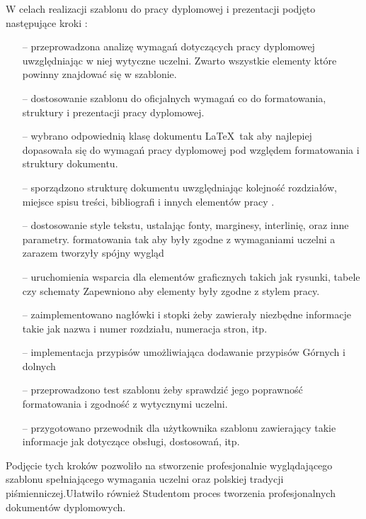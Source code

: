 

W celach realizacji szablonu do pracy dyplomowej i prezentacji podjęto następujące kroki :
\begin{itemize}

\item[--] przeprowadzona analizę wymagań dotyczących pracy dyplomowej uwzględniając w niej wytyczne uczelni. Zwarto wszystkie elementy które powinny znajdować się w szablonie.
\item[--] dostosowanie szablonu do oficjalnych wymagań co do  formatowania, struktury i prezentacji pracy dyplomowej.
\item[--] wybrano odpowiednią klasę dokumentu \LaTeX\ tak aby najlepiej dopasowała się do wymagań pracy dyplomowej pod względem formatowania i struktury dokumentu.
\item[--] sporządzono strukturę dokumentu uwzględniając kolejność rozdziałów, miejsce spisu treści, bibliografi i innych elementów pracy .
\item[--] dostosowanie style tekstu, ustalając fonty, marginesy, interlinię, oraz inne parametry. formatowania tak aby były zgodne z wymaganiami uczelni a zarazem tworzyły spójny wygląd 
\item[--] uruchomienia wsparcia dla elementów graficznych takich  jak rysunki, tabele czy schematy Zapewniono aby elementy były zgodne z stylem pracy.
\item[--] zaimplementowano nagłówki i stopki żeby zawierały niezbędne informacje takie jak nazwa i numer rozdziału, numeracja stron, itp.
\item[--] implementacja przypisów umożliwiająca dodawanie przypisów Górnych i dolnych 
\item[--] przeprowadzono test szablonu żeby sprawdzić jego poprawność formatowania i zgodność z wytycznymi uczelni.
\item[--] przygotowano przewodnik dla użytkownika szablonu zawierający takie informacje jak dotyczące obsługi, dostosowań, itp.
\end{itemize}

Podjęcie tych kroków pozwoliło na stworzenie profesjonalnie wyglądającego szablonu spełniającego wymagania uczelni oraz polskiej tradycji piśmienniczej.Ułatwiło również Studentom proces tworzenia profesjonalnych dokumentów dyplomowych. 
